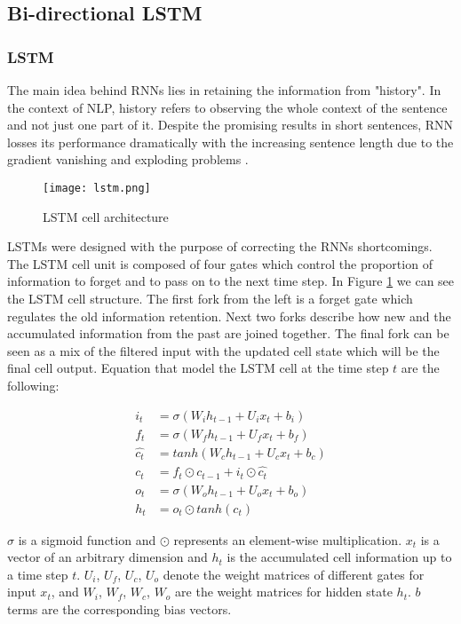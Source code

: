 \subsection{Bi-directional LSTM}

\subsubsection{LSTM}
The main idea behind RNNs lies in retaining the information from "history".
In the context of NLP, history refers to observing the whole context of the
sentence and not just one part of it. Despite the promising results in short
sentences, RNN losses its performance dramatically with the increasing sentence
length due to the gradient vanishing\cite{bengio1994learning}
and exploding problems \cite{pascanu2013difficulty}.

\begin{figure}
  \caption{LSTM cell architecture}
  \label{fig:lstm}
  \centering
    \texttt{[image: lstm.png]}
\end{figure}

LSTMs were designed with the purpose of correcting the RNNs shortcomings. The LSTM
cell unit is composed of four gates which control the proportion of
information to forget and to pass on to the next time step. In Figure
\ref{fig:lstm} we can see the LSTM cell structure. The first fork from the left
is a forget gate which regulates the old information retention. Next two forks 
describe how new and the accumulated information from the past are joined
together. The final fork can be seen as a mix of the filtered input with the
updated cell state which will be the final cell output. Equation that model the
LSTM cell at the time step $t$ are the following:

\begin{align*}
        i_t &= \sigma\left(W_ih_{t-1} + U_{i}x_t + b_i\right)\\
        f_t &= \sigma\left(W_fh_{t-1} + U_{f}x_t + b_f\right)\\
        \hat{c_t} &= tanh\left(W_ch_{t-1} + U_{c}x_t + b_c\right)\\
        c_t &=  f_t \odot c_{t-1} + i_t \odot \hat{c_t}\\
        o_t &= \sigma\left(W_oh_{t-1} + U_{o}x_t + b_o\right)\\
        h_t &= o_t \odot tanh(c_t)
\end{align*}

$\sigma$ is a sigmoid function and $\odot$ represents an element-wise
multiplication. $x_t$ is a vector of an arbitrary dimension and $h_t$ is the
accumulated cell information up to a time step $t$. $U_i$, $U_f$, $U_c$, $U_o$
denote the weight matrices of different gates for input $x_t$, and
$W_i$, $W_f$, $W_c$, $W_o$ are the weight matrices for hidden state $h_t$.
$b$ terms are the corresponding bias vectors.

